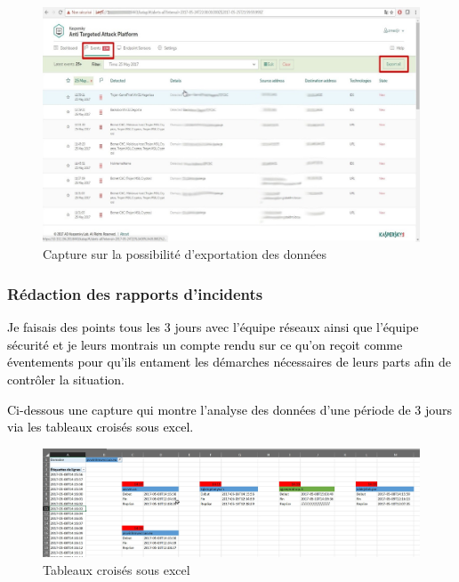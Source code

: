 \documentclass[a4paper,12pt]{report}
\begin{document}
\begin{figure}[H]
	\begin{center}
		\includegraphics[width=1\linewidth]{Projet_KATA/export_kata}
\end{center}
	\caption{Capture sur la possibilité d'exportation des données}
	\label{fig:10}	
\end{figure}		 
		 
\subsubsection{Rédaction des rapports d’incidents}

\textcolor{black}{Je faisais des points tous les 3 jours avec l’équipe réseaux ainsi que l’équipe sécurité et je leurs montrais un compte rendu sur ce qu’on reçoit comme éventements pour qu’ils entament les démarches nécessaires de leurs parts afin de contrôler la situation.}	

\textcolor{black}{Ci-dessous une capture qui montre l’analyse des données d’une période de 3 jours via les tableaux croisés sous excel.}

\begin{figure}[H]
	\begin{center}
		\includegraphics[width=1\linewidth]{Projet_KATA/rapport_excel}
\end{center}
	\caption{Tableaux croisés sous excel}
	\label{fig:11}	
\end{figure}	
		 		 
\end{document}

